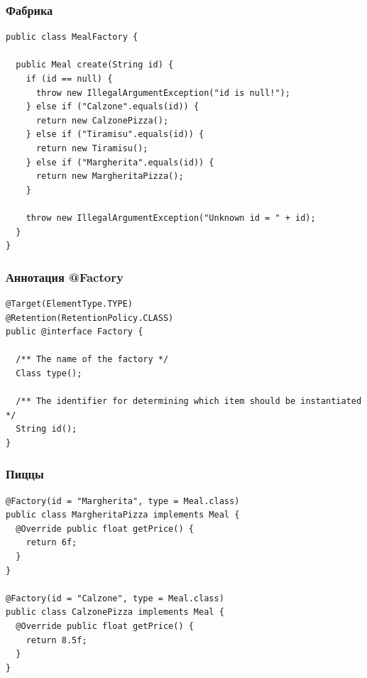 \documentclass[xetex,mathserif,serif]{beamer}
\begin{document}
	\begin{frame}[fragile]
		\frametitle{Фабрика}
		\begin{small}
			\begin{verbatim}
public class MealFactory {

  public Meal create(String id) {
    if (id == null) {
      throw new IllegalArgumentException("id is null!");
    } else if ("Calzone".equals(id)) {
      return new CalzonePizza();
    } else if ("Tiramisu".equals(id)) {
      return new Tiramisu();
    } else if ("Margherita".equals(id)) {
      return new MargheritaPizza();
    }

    throw new IllegalArgumentException("Unknown id = " + id);
  }
}
			\end{verbatim}
		\end{small}
	\end{frame}

	\begin{frame}[fragile]
		\frametitle{Аннотация @Factory}
		\begin{small}
			\begin{verbatim}
@Target(ElementType.TYPE) 
@Retention(RetentionPolicy.CLASS)
public @interface Factory {

  /** The name of the factory */
  Class type();

  /** The identifier for determining which item should be instantiated */
  String id();
}
			\end{verbatim}
		\end{small}
	\end{frame}

	\begin{frame}[fragile]
		\frametitle{Пиццы}
		\begin{small}
			\begin{verbatim}
@Factory(id = "Margherita", type = Meal.class)
public class MargheritaPizza implements Meal {
  @Override public float getPrice() {
    return 6f;
  }
}

@Factory(id = "Calzone", type = Meal.class)
public class CalzonePizza implements Meal {
  @Override public float getPrice() {
    return 8.5f;
  }
}
			\end{verbatim}
		\end{small}
	\end{frame}
\end{document}

